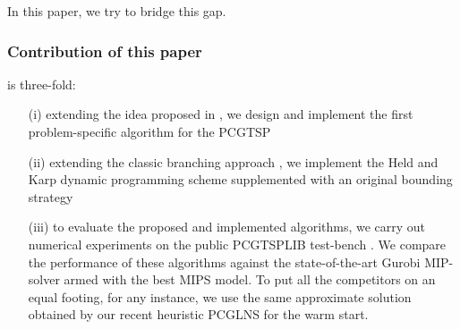 In this paper, we try to bridge this gap.
\subsubsection{Contribution  of this paper} is three-fold:
\begin{itemize}
	\item[(i)] extending the idea proposed in \cite{SALMAN2020163}, we design and implement the first problem-specific algorithm for the PCGTSP
	\item[(ii)] extending the classic branching approach \cite{MorinMarsten1976}, we implement the Held and Karp dynamic programming scheme supplemented with an original bounding strategy
	\item[(iii)] to evaluate the proposed and implemented algorithms, we carry out numerical experiments on the public PCGTSPLIB test-bench \cite{SALMAN2020163}. We compare the performance of these algorithms against the state-of-the-art Gurobi MIP-solver armed with the best MIPS model. To put all the competitors on an equal footing, for any instance, we use the same approximate solution obtained by our recent heuristic PCGLNS \cite{PCGLNS} for the warm start.
\end{itemize}  